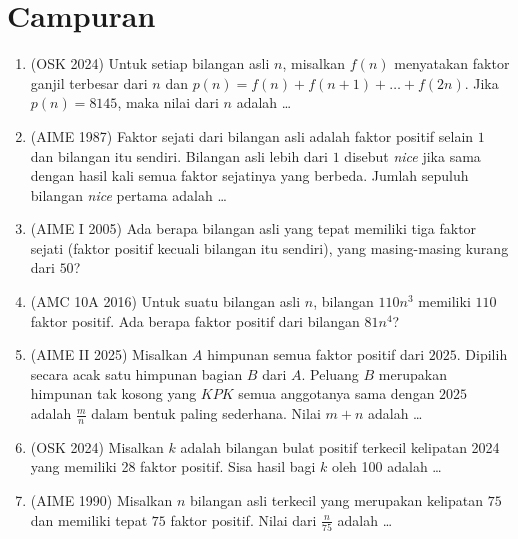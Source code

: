 \documentclass[12pt]{scrartcl}
\begin{document}
\section{Campuran}

\begin{enumerate}[resume]

	\item (OSK 2024)
	Untuk setiap bilangan asli $n$, misalkan $f(n)$ menyatakan faktor ganjil
	terbesar dari $n$ dan $p(n) = f(n) + f(n+1) + \dots + f(2n)$.
	Jika $p(n) = 8145$, maka nilai dari $n$ adalah \dots

	\item (AIME 1987)
	Faktor sejati dari bilangan asli adalah faktor positif selain $1$ dan
	bilangan itu sendiri. Bilangan asli lebih dari $1$ disebut \textit{nice}
	jika sama dengan hasil kali semua faktor sejatinya yang berbeda.
	Jumlah sepuluh bilangan \textit{nice} pertama adalah \dots

	\item (AIME I 2005)
	Ada berapa bilangan asli yang tepat memiliki tiga faktor sejati
	(faktor positif kecuali bilangan itu sendiri),
	yang masing-masing kurang dari $50$?

	\item (AMC 10A 2016)
	Untuk suatu bilangan asli $n$, bilangan $110n^{3}$ memiliki $110$ faktor
	positif. Ada berapa faktor positif dari bilangan $81n^{4}$?

	\item (AIME II 2025)
	Misalkan $A$ himpunan semua faktor positif dari $2025$.
	Dipilih secara acak satu himpunan bagian $B$ dari $A$.
	Peluang $B$ merupakan himpunan tak kosong yang $KPK$ semua anggotanya
	sama dengan $2025$ adalah $\frac{m}{n}$ dalam bentuk paling sederhana.
	Nilai $m + n$ adalah \dots

	\item (OSK 2024)
	Misalkan $k$ adalah bilangan bulat positif terkecil kelipatan 2024
	yang memiliki 28 faktor positif.
	Sisa hasil bagi $k$ oleh 100 adalah \dots

	\item (AIME 1990)
	Misalkan $n$ bilangan asli terkecil yang merupakan kelipatan $75$
	dan memiliki tepat $75$ faktor positif.
	Nilai dari $\frac{n}{75}$ adalah \dots


\end{enumerate}
\end{document}
